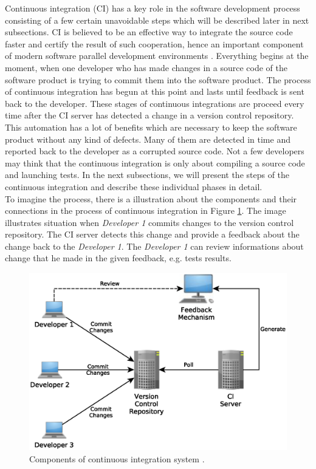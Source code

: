 Continuous integration (CI) has a key role in the software development process consisting of a few certain unavoidable steps which will be described later in next subsections. CI is believed to be an effective way to integrate the source code faster and certify the result of such cooperation, hence an important component of modern software parallel development environments \cite{ResultsOfCIbuild}. Everything begins at the moment, when one developer who has made changes in a source code of the software product is trying to commit them into the software product. The process of continuous integration has begun at this point and lasts until feedback is sent back to the developer. These stages of continuous integrations are proceed every time after the CI server has detected a change in a version control repository. This automation has a lot of benefits which are necessary to keep the software product without any kind of defects. Many of them are detected in time and reported back to the developer as a corrupted source code. Not a few developers may think that the continuous integration is only about compiling a source code and launching tests. In the next subsections, we will present the steps of the continuous integration and describe these individual phases in detail.\\

To imagine the process, there is a illustration about the components and their connections in the process of continuous integration in Figure \ref{fig:cocis}. The image illustrates situation when \textit{Developer 1} commits changes to the version control repository. The CI server detects this change and provide a feedback about the change back to the \textit{Developer 1}. The \textit{Developer 1} can review informations about change that he made in the given feedback, e.g. tests results.

\begin{figure}[H]
	\centering
	\includegraphics[scale=0.6]{yEd/components_of_CI_system.eps}
	\caption{Components of continuous integration system \cite{CIbook}.}
	\label{fig:cocis}
\end{figure}

